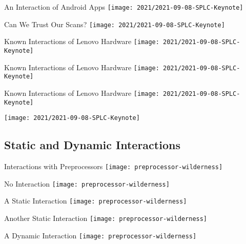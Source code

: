 \begin{frame}{An Interaction of Android Apps}
	\centering\texttt{[image: 2021/2021-09-08-SPLC-Keynote]}
\end{frame}

\begin{frame}{Can We Trust Our Scans?}
	\centering\texttt{[image: 2021/2021-09-08-SPLC-Keynote]}
\end{frame}

\begin{frame}{Known Interactions of Lenovo Hardware}
	\centering\texttt{[image: 2021/2021-09-08-SPLC-Keynote]}
\end{frame}
\begin{frame}{Known Interactions of Lenovo Hardware}
	\centering\texttt{[image: 2021/2021-09-08-SPLC-Keynote]}
\end{frame}
\begin{frame}{Known Interactions of Lenovo Hardware}
	\centering\texttt{[image: 2021/2021-09-08-SPLC-Keynote]}
\end{frame}
\begin{frame}
	\centering\texttt{[image: 2021/2021-09-08-SPLC-Keynote]}
\end{frame}

\subsection{Static and Dynamic Interactions}
\begin{frame}{Interactions with Preprocessors}
	\centering
	\texttt{[image: preprocessor-wilderness]}
\end{frame}
\begin{frame}{No Interaction}
	\centering
	\texttt{[image: preprocessor-wilderness]}
\end{frame}
\begin{frame}{A Static Interaction}
	\centering
	\texttt{[image: preprocessor-wilderness]}
\end{frame}
\begin{frame}{Another Static Interaction}
	\centering
	\texttt{[image: preprocessor-wilderness]}
\end{frame}
\begin{frame}{A Dynamic Interaction}
	\centering
	\texttt{[image: preprocessor-wilderness]}
\end{frame}

